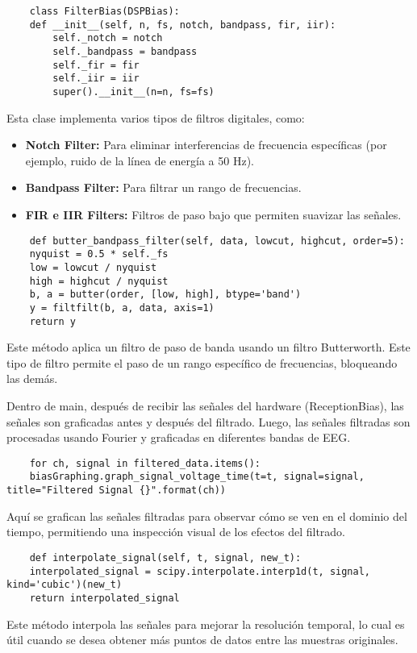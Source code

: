\documentclass{article}
\begin{document}
\begin{lstlisting}
    class FilterBias(DSPBias):
    def __init__(self, n, fs, notch, bandpass, fir, iir):
        self._notch = notch
        self._bandpass = bandpass
        self._fir = fir
        self._iir = iir
        super().__init__(n=n, fs=fs)
\end{lstlisting}
Esta clase implementa varios tipos de filtros digitales, como:
\begin{itemize}
    \item \textbf{Notch Filter:} Para eliminar interferencias de frecuencia específicas (por ejemplo, ruido de la línea de energía a 50 Hz).
    \item \textbf{Bandpass Filter:} Para filtrar un rango de frecuencias.
    \item \textbf{FIR e IIR Filters:} Filtros de paso bajo que permiten suavizar las señales.
\end{itemize}

\begin{lstlisting}
    def butter_bandpass_filter(self, data, lowcut, highcut, order=5):
    nyquist = 0.5 * self._fs
    low = lowcut / nyquist
    high = highcut / nyquist
    b, a = butter(order, [low, high], btype='band')
    y = filtfilt(b, a, data, axis=1)
    return y
\end{lstlisting}
Este método aplica un filtro de paso de banda usando un filtro Butterworth. Este tipo de filtro permite el paso de un rango específico de frecuencias, bloqueando las demás.

Dentro de main, después de recibir las señales del hardware (ReceptionBias), las señales son graficadas antes y después del filtrado. Luego, las señales filtradas son procesadas usando Fourier y graficadas en diferentes bandas de EEG.

\begin{lstlisting}
    for ch, signal in filtered_data.items():
    biasGraphing.graph_signal_voltage_time(t=t, signal=signal, title="Filtered Signal {}".format(ch))
\end{lstlisting}
Aquí se grafican las señales filtradas para observar cómo se ven en el dominio del tiempo, permitiendo una inspección visual de los efectos del filtrado.
\begin{lstlisting}
    def interpolate_signal(self, t, signal, new_t):
    interpolated_signal = scipy.interpolate.interp1d(t, signal, kind='cubic')(new_t)
    return interpolated_signal
\end{lstlisting}
Este método interpola las señales para mejorar la resolución temporal, lo cual es útil cuando se desea obtener más puntos de datos entre las muestras originales.
\end{document}
